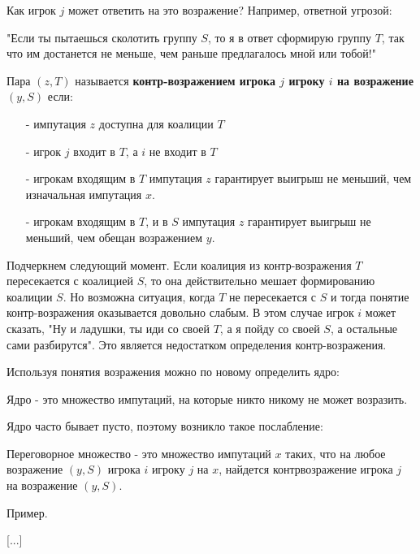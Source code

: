 Как игрок $j$ может ответить на это возражение? Например, ответной угрозой: 

"Если ты пытаешься сколотить группу $S$, то я в ответ сформирую группу $T$, так что им достанется не меньше, чем раньше предлагалось мной или тобой!"

\begin{definition}
Пара $(z,T)$ называется \textbf{контр-возражением игрока $j$ игроку $i$ на возражение $(y,S)$} если:

\begin{itemize}
\item[-] импутация $z$ доступна для коалиции $T$
\item[-] игрок $j$ входит в $T$, а $i$ не входит в $T$
\item[-] игрокам входящим в $T$ импутация $z$ гарантирует выигрыш не меньший, чем изначальная импутация $x$.
\item[-] игрокам входящим в $T$, и в $S$ импутация $z$ гарантирует выигрыш не меньший, чем обещан возражением $y$.
\end{itemize}
\end{definition}

Подчеркнем следующий момент. Если коалиция из контр-возражения $T$ пересекается с коалицией $S$, то она действительно мешает формированию коалиции $S$. Но возможна ситуация, когда $T$ не пересекается с $S$ и тогда понятие контр-возражения оказывается довольно слабым. В этом случае игрок $i$ может сказать, "Ну и ладушки, ты иди со своей $T$, а я пойду со своей $S$, а остальные сами разбирутся". Это является недостатком определения контр-возражения. 

Используя понятия возражения можно по новому определить ядро:

\begin{definition}
Ядро - это множество импутаций, на которые никто никому не может возразить.
\end{definition}

Ядро часто бывает пусто, поэтому возникло такое послабление:

\begin{definition}
Переговорное множество - это множество импутаций $x$ таких, что на любое возражение $(y,S)$ игрока $i$ игроку $j$ на $x$, найдется контрвозражение игрока $j$ на возражение $(y,S)$.
\end{definition}


Пример.


[...]



